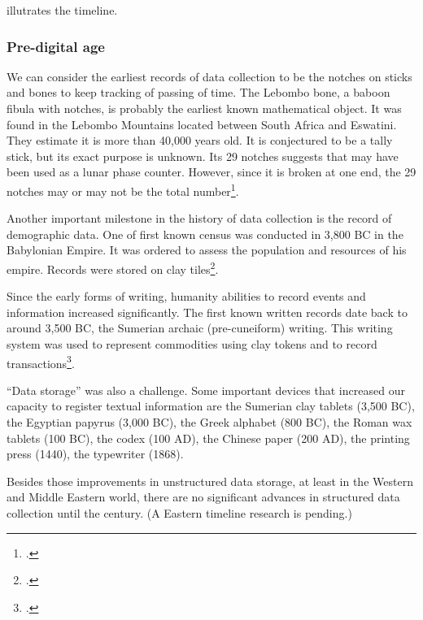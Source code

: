  illutrates the timeline.

\subsubsection{Pre-digital age}

We can consider the earliest records of data collection to be the notches on sticks and
bones to keep tracking of passing of time.  The Lebombo bone, a baboon fibula with
notches, is probably the earliest known mathematical object.  It was found in the Lebombo
Mountains located between South Africa and Eswatini.
They estimate it is more
than 40,000 years old. It is conjectured to be a tally stick, but its exact purpose is
unknown. Its 29 notches suggests that may have been used as a lunar phase counter.
However, since it is broken at one end, the 29 notches may or may not be the total
number\footcite{Beaumont2013}.

Another important milestone in the history of data collection is the record of
demographic data.  One of first known census was conducted in 3,800 BC in the Babylonian
Empire.  It was ordered to assess the population and resources of
his empire.  Records were stored on  clay  tiles\footcite{Grajalez2013}.

Since the early forms of writing, humanity abilities to record events and information
increased significantly.  The first known written records date back to around 3,500 BC, the
Sumerian archaic (pre-cuneiform) writing.  This writing system was used to represent
commodities using clay tokens and to record transactions\footcite{Ifrah1998}.

``Data storage'' was also a challenge.  Some important devices that increased our capacity
to register textual information are the Sumerian clay tablets (3,500 BC), the Egyptian
papyrus (3,000 BC), the Greek alphabet (800 BC), the Roman wax tablets (100 BC), the codex
(100 AD), the Chinese paper (200 AD), the printing press (1440), the typewriter (1868).


Besides those improvements in unstructured data storage, at least in the Western and
Middle Eastern world, there are no significant advances in structured data collection
until the  century.  (A Eastern timeline research is pending.)

